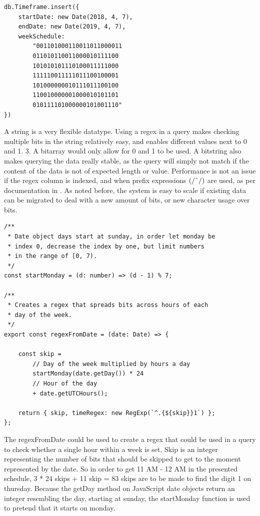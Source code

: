 \begin{center}
	\noindent\begin{minipage}{.45\textwidth}
		\begin{lstlisting}[caption={Improved timeframe.}, label={lst:new-timeframe}]
db.Timeframe.insert({
	startDate: new Date(2018, 4, 7),
	endDate: new Date(2019, 4, 7),
	weekSchedule:
		"001101000110011011000011
		011010110011000010111100
		101010101110100011111000
		111110011111011100100001
		101000000010111011100100
		110010000001000010101101
		010111101000000101001110"
})
\end{lstlisting}
	\end{minipage}
\end{center}

A string is a very flexible datatype. Using a regex in a query makes checking multiple bits in the string relatively easy, and enables different values next to 0 and 1. 3. A bitarray would only allow for 0 and 1 to be used. A bitstring also makes querying the data really stable, as the query will simply not match if the content of the data is not of expected length or value. Performance is not an issue if the regex column is indexed, and when prefix expressions $(/\string^/)$ are used, as per documentation in \cite{MongoDB-Regex}. As noted before, the system is easy to scale if existing data can be migrated to deal with a new amount of bits, or new character usage over bits.

\begin{lstlisting}[caption={Opening timeframe.}, label={lst:open-timeframe}]
/**
 * Date object days start at sunday, in order let monday be
 * index 0, decrease the index by one, but limit numbers
 * in the range of [0, 7).
 */
const startMonday = (d: number) => (d - 1) % 7;

/**
 * Creates a regex that spreads bits across hours of each
 * day of the week.
 */
export const regexFromDate = (date: Date) => {

	const skip =
		// Day of the week multiplied by hours a day
		startMonday(date.getDay()) * 24
		// Hour of the day
		+ date.getUTCHours();

	return { skip, timeRegex: new RegExp(`^.{${skip}}1`) };
};
\end{lstlisting}

The regexFromDate could be used to create a regex that could be used in a query to check whether a single hour within a week is set. Skip is an integer representing the number of bits that should be skipped to get to the moment represented by the date. So in order to get 11 AM - 12 AM in the presented schedule, 3 * 24 skips + 11 skip = 83 skips are to be made to find the digit 1 on thursday. Because the getDay method on JavaScript date objects return an integer resembling the day, starting at sunday, the startMonday function is used to pretend that it starts on monday.

